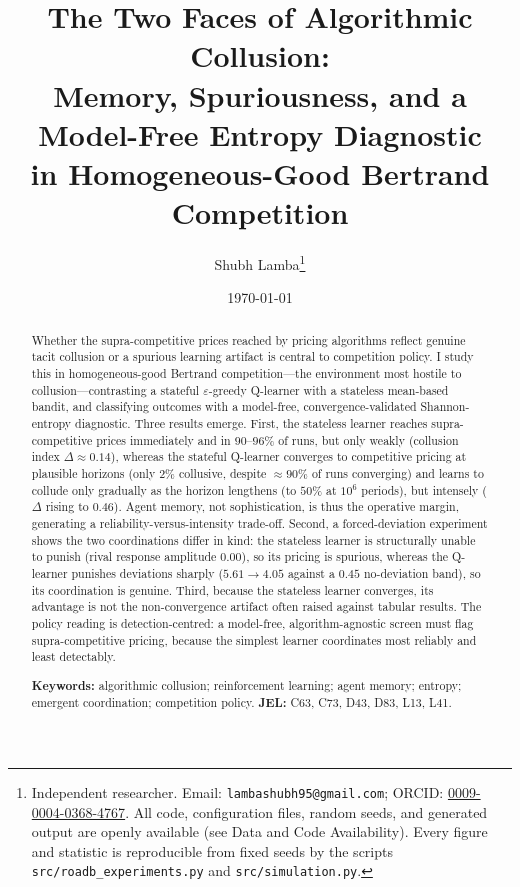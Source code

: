 \documentclass[11pt]{article}
\title{\textbf{The Two Faces of Algorithmic Collusion:\\ Memory, Spuriousness, and a Model-Free Entropy Diagnostic\\ in Homogeneous-Good Bertrand Competition}}
\author{Shubh Lamba\thanks{Independent researcher. Email: \texttt{lambashubh95@gmail.com};
ORCID: \href{https://orcid.org/0009-0004-0368-4767}{0009-0004-0368-4767}.
All code, configuration files, random seeds, and generated output are openly available
(see Data and Code Availability). Every figure and statistic is reproducible from fixed seeds
by the scripts \texttt{src/roadb\_experiments.py} and \texttt{src/simulation.py}.}}
\date{\today}
\begin{document}
\maketitle

\begin{abstract}
\noindent Whether the supra-competitive prices reached by pricing algorithms reflect genuine tacit
collusion or a spurious learning artifact is central to competition policy. I study this in homogeneous-good
Bertrand competition---the environment most hostile to collusion---contrasting a stateful
$\varepsilon$-greedy Q-learner with a stateless mean-based bandit, and classifying outcomes with a
model-free, convergence-validated Shannon-entropy diagnostic. Three results emerge. First, the stateless
learner reaches supra-competitive prices immediately and in $90$--$96\%$ of runs, but only weakly (collusion
index $\Delta\approx0.14$), whereas the stateful Q-learner converges to competitive pricing at plausible
horizons (only $2\%$ collusive, despite $\approx 90\%$ of runs converging) and learns to collude only
gradually as the horizon lengthens (to $50\%$ at $10^6$ periods), but intensely ($\Delta$ rising to $0.46$).
Agent memory, not sophistication, is thus the operative margin, generating a reliability-versus-intensity
trade-off. Second, a forced-deviation experiment shows the two coordinations differ in kind: the stateless
learner is structurally unable to punish (rival response amplitude $0.00$), so its pricing is spurious,
whereas the Q-learner punishes deviations sharply ($5.61\!\to\!4.05$ against a $0.45$ no-deviation band), so
its coordination is genuine. Third, because the stateless learner converges, its advantage is not the
non-convergence artifact often raised against tabular results. The policy reading is detection-centred: a
model-free, algorithm-agnostic screen must flag supra-competitive pricing, because the simplest learner
coordinates most reliably and least detectably.

\medskip
\noindent\textbf{Keywords:} algorithmic collusion; reinforcement learning; agent memory; entropy;
emergent coordination; competition policy. \quad \textbf{JEL:} C63, C73, D43, D83, L13, L41.
\end{abstract}
\end{document}
